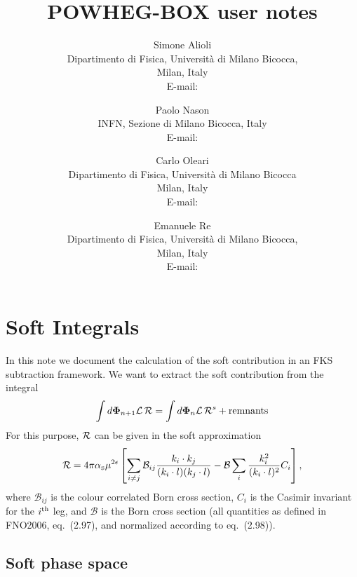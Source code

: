 \documentclass[paper]{JHEP3}
\title{POWHEG-BOX user notes }
\author{Simone Alioli \\
Dipartimento di Fisica, Universit\`a di Milano Bicocca,\\
Milan, Italy\\
E-mail: \email{Simone.Alioli@mib.infn.it}}
\author{Paolo Nason \\
INFN, Sezione di Milano Bicocca, Italy\\
E-mail: \email{Paolo.Nason@mib.infn.it}}
\author{Carlo Oleari \\
Dipartimento di Fisica, Universit\`a di Milano Bicocca\\
Milan, Italy\\
E-mail: \email{Carlo.Oleari@mib.infn.it}}
\author{Emanuele Re \\
Dipartimento di Fisica, Universit\`a di Milano Bicocca,\\
Milan, Italy\\
E-mail: \email{Emanuele.Re@mib.infn.it}}
\newcommand\sss{\mathchoice%
{\displaystyle}%
{\scriptstyle}%
{\scriptscriptstyle}%
{\scriptscriptstyle}%
}
\newcommand\Lum{{\cal L}}
\newcommand\matR{{\cal R}}
\newcommand\Kinnpo{{\bf \Phi}_{n+1}}
\newcommand\Kinn{{\bf \Phi}_n}
\newcommand\as{\alpha_{\sss\rm S}}
\begin{document}
\section{Soft Integrals}
In this note we document the calculation of the soft contribution in an FKS
subtraction framework. We want to extract the soft contribution from the
integral
\begin{equation}
  \int d \Kinnpo \Lum \,\matR = \int  d \Kinn \Lum\,\matR^s + {\rm remnants}
\end{equation}
For this purpose, $\matR$ can be given in the soft approximation
\begin{equation}
  \matR = 4 \pi \as \mu^{2 \epsilon}  \left[ \sum_{i \neq j}
  \mathcal{B}_{i 
  j} \frac{k_i \cdot k_j}{(k_i \cdot l) (k_j \cdot l)} - \mathcal{B} \sum_i
  \frac{k_i^2}{(k_i \cdot l)^2} C_i \right],
\end{equation}
where $\mathcal{B}_{i j}$ is the colour correlated Born cross section, $C_i$ is
the Casimir invariant for the $i^{\rm th}$ leg, and $\mathcal{B}$ is the
Born cross section (all quantities as defined in FNO2006, eq.~(2.97), and
normalized according to eq.~(2.98)).



\subsection{Soft phase space}
\end{document}
